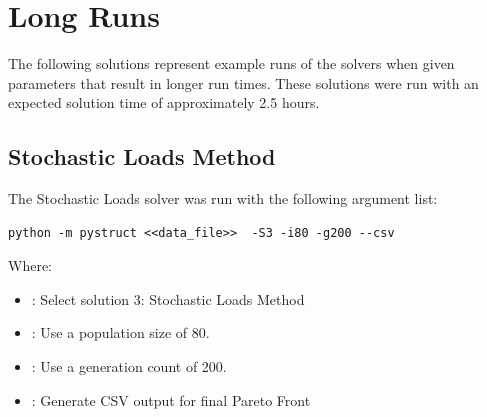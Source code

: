 \section{Long Runs}
The following solutions represent example runs of the solvers when given parameters that result in longer run times. These solutions were run with an expected solution time of approximately 2.5 hours. 

\subsection{Stochastic Loads Method}
The Stochastic Loads solver was run with the following argument list: 

\begin{verbatim}
python -m pystruct <<data_file>>  -S3 -i80 -g200 --csv
\end{verbatim}

\noindent Where: 

\begin{itemize}
  \item {}: Select solution 3: Stochastic Loads Method
  \item {}: Use a population size of 80. 
  \item {}: Use a generation count of 200. 
  \item {}: Generate CSV output for final Pareto Front
\end{itemize}


